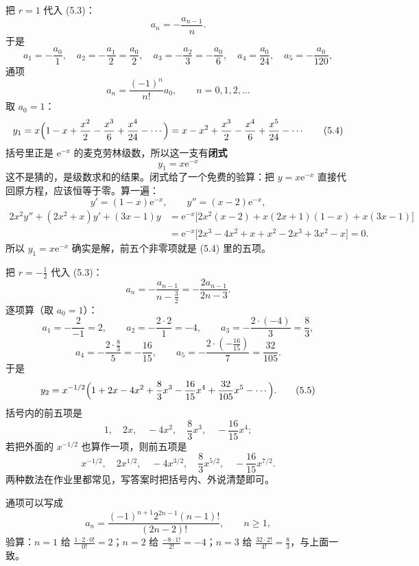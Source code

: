 \documentclass[11pt]{ctexart}
\let\origsubhdr\subhdr
\renewcommand{\subhdr}[1]{\needspace{3\baselineskip}\origsubhdr{#1}}
\newcommand{\ee}{\mathrm{e}}
\begin{document}

把 $r=1$ 代入 (5.3)：
\[
a_n=-\frac{a_{n-1}}{n}.
\]
于是
\[
a_1=-\frac{a_0}{1},\quad
a_2=-\frac{a_1}{2}=\frac{a_0}{2},\quad
a_3=-\frac{a_2}{3}=-\frac{a_0}{6},\quad
a_4=\frac{a_0}{24},\quad
a_5=-\frac{a_0}{120},
\]
通项
\[
a_n=\frac{(-1)^n}{n!}a_0,\qquad n=0,1,2,\dots
\]
取 $a_0=1$：
\[
y_1=x\Bigl(1-x+\frac{x^2}{2}-\frac{x^3}{6}+\frac{x^4}{24}-\cdots\Bigr)
=x-x^2+\frac{x^3}{2}-\frac{x^4}{6}+\frac{x^5}{24}-\cdots \tag{5.4}
\]
括号里正是 $\ee^{-x}$ 的麦克劳林级数，所以这一支有\textbf{闭式}
\[
\boxed{\,y_1=x\ee^{-x}\,}
\]
这不是猜的，是级数求和的结果。闭式给了一个免费的验算：把 $y=x\ee^{-x}$ 直接代回原方程，应该恒等于零。算一遍：
\[
y'=(1-x)\ee^{-x},\qquad y''=(x-2)\ee^{-x},
\]
\begin{align*}
2x^2y''+(2x^2+x)y'+(3x-1)y
&=\ee^{-x}\bigl[2x^2(x-2)+x(2x+1)(1-x)+x(3x-1)\bigr]\\
&=\ee^{-x}\bigl[2x^3-4x^2+x+x^2-2x^3+3x^2-x\bigr]=0 .
\end{align*}
所以 $y_1=x\ee^{-x}$ 确实是解，前五个非零项就是 (5.4) 里的五项。


把 $r=-\frac12$ 代入 (5.3)：
\[
a_n=-\frac{a_{n-1}}{n-\frac32}=-\frac{2a_{n-1}}{2n-3}.
\]
逐项算（取 $a_0=1$）：
\[
a_1=-\frac{2}{-1}=2,\qquad
a_2=-\frac{2\cdot2}{1}=-4,\qquad
a_3=-\frac{2\cdot(-4)}{3}=\frac83,
\]
\[
a_4=-\frac{2\cdot\frac83}{5}=-\frac{16}{15},\qquad
a_5=-\frac{2\cdot(-\frac{16}{15})}{7}=\frac{32}{105}.
\]
于是
\[
y_2=x^{-1/2}\Bigl(1+2x-4x^2+\frac83x^3-\frac{16}{15}x^4+\frac{32}{105}x^5-\cdots\Bigr). \tag{5.5}
\]
括号内的前五项是
\[
1,\quad 2x,\quad -4x^2,\quad \frac83x^3,\quad -\frac{16}{15}x^4 ;
\]
若把外面的 $x^{-1/2}$ 也算作一项，则前五项是
\[
x^{-1/2},\quad 2x^{1/2},\quad -4x^{3/2},\quad \frac83x^{5/2},\quad -\frac{16}{15}x^{7/2}.
\]
两种数法在作业里都常见，写答案时把括号内、外说清楚即可。

通项可以写成
\[
a_n=\frac{(-1)^{n+1}2^{2n-1}(n-1)!}{(2n-2)!},\qquad n\geq1,
\]
验算：$n=1$ 给 $\frac{1\cdot2\cdot0!}{0!}=2$；$n=2$ 给 $\frac{-8\cdot1!}{2!}=-4$；$n=3$ 给 $\frac{32\cdot2!}{4!}=\frac83$，与上面一致。


\end{document}
